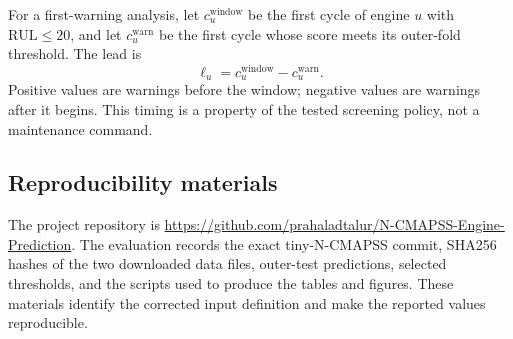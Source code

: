 For a first-warning analysis, let $c_u^{\mathrm{window}}$ be the first cycle
of engine $u$ with $\mathrm{RUL}\leq20$, and let $c_u^{\mathrm{warn}}$ be the
first cycle whose score meets its outer-fold threshold. The lead is
\begin{equation}
\ell_u=c_u^{\mathrm{window}}-c_u^{\mathrm{warn}}.
\label{eq:lead}
\end{equation}
Positive values are warnings before the window; negative values are warnings
after it begins. This timing is a property of the tested screening policy, not
a maintenance command.

\subsection{Reproducibility materials}

The project repository is
\url{https://github.com/prahaladtalur/N-CMAPSS-Engine-Prediction}. The
evaluation records the exact tiny-N-CMAPSS commit, SHA256 hashes of the two
downloaded data files, outer-test predictions, selected thresholds, and the
scripts used to produce the tables and figures. These materials identify the
corrected input definition and make the reported values reproducible.
